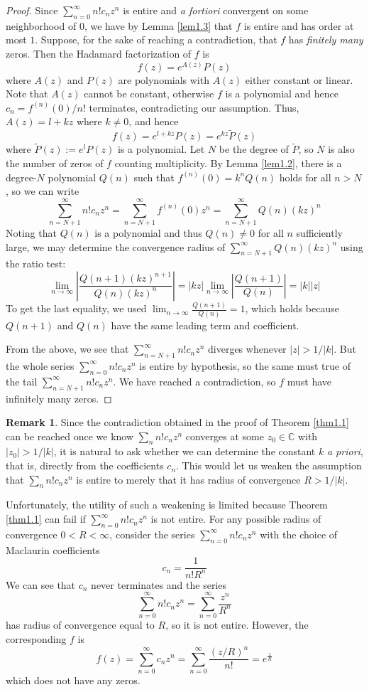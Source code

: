\documentclass[12pt,a4paper,reqno]{amsart}
\numberwithin{equation}{section}
\theoremstyle{plain}
\theoremstyle{definition}
\newtheorem{remark}[theorem]{Remark}
\newcommand\C{\mathbb{C}}
\begin{document}
    \begin{proof}
        Since $\sum_{n=0}^\infty n!c_n z^n$ is entire and \textit{a fortiori} convergent on some neighborhood of $0$, we have by Lemma \ref{lem1.3} that $f$ is entire and has order at most $1$. Suppose, for the sake of reaching a contradiction, that $f$ has \textit{finitely many} zeros. Then the Hadamard factorization of $f$ is
        $$f(z)=e^{A(z)}P(z)$$
        where $A(z)$ and $P(z)$ are polynomials with $A(z)$ either constant or linear. Note that $A(z)$ cannot be constant, otherwise $f$ is a polynomial and hence $c_n=f^{(n)}(0)/n!$ terminates, contradicting our assumption. Thus, $A(z)=l+kz$ where $k\neq 0$, and hence
        $$f(z)=e^{l+kz}P(z)=e^{kz}\tilde{P}(z)$$
        where $\tilde{P}(z):=e^l P(z)$ is a polynomial. Let $N$ be the degree of $\tilde P$, so $N$ is also the number of zeros of $f$ counting multiplicity. By Lemma \ref{lem1.2}, there is a degree-$N$ polynomial $Q(n)$ such that $f^{(n)}(0)=k^n Q(n)$ holds for all $n>N$, so we can write
        $$\sum_{n=N+1}^\infty n!c_n z^n = \sum_{n=N+1}^\infty f^{(n)}(0) z^n=\sum_{n=N+1}^\infty Q(n) (kz)^n$$
        Noting that $Q(n)$ is a polynomial and thus $Q(n)\neq 0$ for all $n$ sufficiently large, we may determine the convergence radius of $\sum_{n=N+1}^\infty Q(n) (kz)^n$ using the ratio test:
        $$\lim_{n\to\infty}\left|\frac{Q(n+1) (kz)^{n+1}}{Q(n) (kz)^n}\right|=|kz|\lim_{n\to\infty}\left|\frac{Q(n+1)}{Q(n)}\right|=|k||z|$$
        To get the last equality, we used $\lim_{n\to\infty}\frac{Q(n+1)}{Q(n)}=1$, which holds because $Q(n+1)$ and $Q(n)$ have the same leading term and coefficient.
        
        From the above, we see that $\sum_{n=N+1}^\infty n! c_n z^n$ diverges whenever $|z|>1/|k|$. But the whole series $\sum_{n=0}^\infty n! c_n z^n$ is entire by hypothesis, so the same must true of the tail $\sum_{n=N+1}^\infty n!c_n z^n$. We have reached a contradiction, so $f$ must have infinitely many zeros.
    \end{proof}
    \begin{remark}
        Since the contradiction obtained in the proof of Theorem \ref{thm1.1} can be reached once we know $\sum_n n! c_n z^n$ converges at some $z_0\in\C$ with $|z_0|>1/|k|$, it is natural to ask whether we can determine the constant $k$ \textit{a priori}, that is, directly from the coefficients $c_n$. This would let us weaken the assumption that $\sum_n n! c_n z^n$ is entire to merely that it has radius of convergence $R>1/|k|$.
        
        Unfortunately, the utility of such a weakening is limited because Theorem \ref{thm1.1} can fail if $\sum_{n=0}^\infty n! c_n z^n$ is not entire. For any possible radius of convergence $0<R<\infty$, consider the series $\sum_{n=0}^\infty n! c_n z^n$ with the choice of Maclaurin coefficients
        $$c_n=\frac{1}{n! R^n}$$
        We can see that $c_n$ never terminates and the series
        $$\sum_{n=0}^\infty n! c_n z^n=\sum_{n=0}^\infty \frac{z^n}{R^n}$$
        has radius of convergence equal to $R$, so it is not entire. However, the corresponding $f$ is
        $$f(z)=\sum_{n=0}^\infty c_n z^n =\sum_{n=0}^\infty \frac{(z/R)^n}{n!}=e^{\frac{z}{R}}$$
        which does not have any zeros.
    \end{remark}
\end{document}

